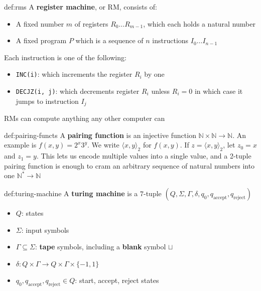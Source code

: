 \documentclass[landscape, 8pt]{extarticle}
\begin{document}
\begin{multicols}{3}
\begin{dfn}{def:rms}{}
A \textbf{register machine}, or RM, consists of:
\renewcommand\labelitemi{\tiny$\bullet$}
\begin{itemize}
    \setlength\itemsep{0em}
    \item A fixed number $m$ of registers $R_{0}\dots R_{m-1}$, which each holds a natural number
    \item A fixed program $P$ which is a sequence of $n$ instructions $I_{0} \dots I_{n-1}$
\end{itemize}
Each instruction is one of the following:
\renewcommand\labelitemi{\tiny$\bullet$}
\begin{itemize}
    \setlength\itemsep{0em}
    \item \texttt{INC(i)}: which increments the register $R_i$ by one
    \item \texttt{DECJZ(i, j)}: which decrements register $R_i$ unless $R_i = 0$ in which case it jumps to instruction $I_j$
\end{itemize}
RMs can compute anything any other computer can
\end{dfn}


\begin{dfn}{def:pairing-functs}{}
A \textbf{pairing function} is an injective function $\mathbb{N} \times \mathbb{N} \to \mathbb{N}$. An example is $f(x,y) = 2^{x}3^{y}$.
\newline
We write $\langle x,y\rangle_{2}$ for $f(x,y)$. If $z = \langle x,y\rangle_{2}$, let $z_{0} = x$ and $z_{1} = y$.
This lets us encode multiple values into a single value, and a 2-tuple pairing function is enough to cram an arbitrary sequence of natural numbers into one $\mathbb{N}^{*}\to \mathbb{N}$
\end{dfn}

\begin{dfn}{def:turing-machine}{}
A \textbf{turing machine} is a $7$-tuple $(Q, \Sigma, \Gamma, \delta, q_{0}, q_{\text{accept}}, q_{\text{reject}})$
\renewcommand\labelitemi{\tiny$\bullet$}
\begin{itemize}
    \setlength\itemsep{0em}
    \item $Q$: states
    \item $\Sigma$: input symbols
    \item $\Gamma\subseteq\Sigma$: \textbf{tape} symbols, including a \textbf{blank} symbol $\sqcup$
    \item $\delta : Q \times \Gamma \to Q \times \Gamma \times \{-1, 1\}$
    \item $q_{0}, q_{\text{accept}}, q_{\text{reject}}\in Q$: start, accept, reject states
\end{itemize}
\end{dfn}


\end{multicols}
\end{document}

